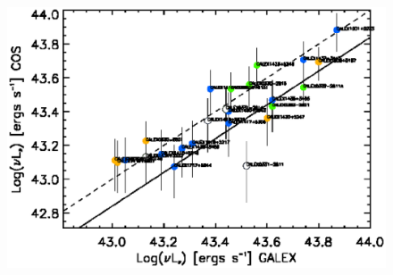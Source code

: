 \documentclass[manuscript]{emulateapj}
\begin{document}
\begin{figure}[t!]
  \centering
  \includegraphics[scale=0.46]{NUV_fluxes.ps}

\end{figure}
\end{document}
